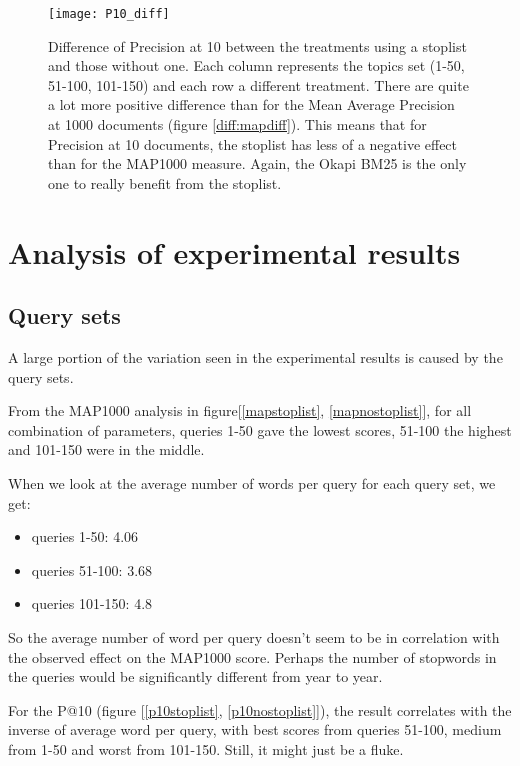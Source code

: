 \documentclass{article} %
\begin{document}
\begin{figure}[!htb]
\begin{center}
 \texttt{[image: P10\_diff]}
 \caption{\small  Difference of Precision at 10
  between the treatments using a stoplist and those without one. Each column represents the topics set (1-50, 51-100, 101-150) and each row a different treatment. There are quite a lot more positive difference than for the Mean Average Precision at 1000 documents (figure \ref{diff:mapdiff}). This means that for Precision at 10 documents, the stoplist has less of a negative effect than for the MAP1000 measure. Again, the Okapi BM25 is the only one to really benefit from the stoplist.}
   \label{p10diff}
 \end{center}
\end{figure}


\section{Analysis of experimental results}
\label{analysis_results}

\subsection{Query sets}
A large portion of the variation seen in the experimental results is caused by the query sets.

From the MAP1000 analysis in figure[\ref{mapstoplist}, \ref{mapnostoplist}], for all combination of parameters, queries 1-50 gave the lowest scores, 51-100 the highest and 101-150 were in the middle.\newline


When we look at the average number of words per query for each query set, we get:
\begin{itemize}
	\item queries 1-50: 4.06
	\item queries 51-100: 3.68
	\item queries 101-150: 4.8
\end{itemize}

So the average number of word per query doesn't seem to be in correlation with the observed effect on the MAP1000 score. Perhaps the number of stopwords in the queries would be significantly different from year to year.

For the P@10 (figure [\ref{p10stoplist}, \ref{p10nostoplist}]), the result correlates with the inverse of average word per query, with best scores from queries 51-100, medium from 1-50 and worst from 101-150. Still, it might just be a fluke.
\end{document}
